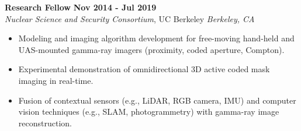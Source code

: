 \textbf{Research Fellow} \hfill \textbf{Nov 2014 - Jul 2019} \\
\textsl{Nuclear Science and Security Consortium}, UC Berkeley \hfill \textsl{Berkeley, CA} \\[-2.8ex]
\vspace{2pt}
\begin{itemize}[leftmargin=4ex] \itemsep -2pt
    \item Modeling and imaging algorithm development for free-moving hand-held and UAS-mounted gamma-ray imagers (proximity, coded aperture, Compton).
    \item Experimental demonstration of omnidirectional 3D active coded mask imaging in real-time.
    \item Fusion of contextual sensors (e.g., LiDAR, RGB camera, IMU) and computer vision techniques (e.g., SLAM, photogrammetry) with gamma-ray image reconstruction.
\end{itemize}

